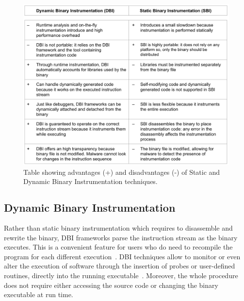 \documentclass[LaM,binding=0.6cm]{sapthesis}
\begin{document}
\begin{figure}[t]
\centering
\includegraphics[scale=.5]{images/techn6}
\caption{Table showing advantages (+) and disadvantages (-) of Static and Dynamic Binary Instrumentation techniques.}
\end{figure}
\subsection{Dynamic Binary Instrumentation}
\label{subsec:dbi}
Rather than static binary instrumentation which requires to disassemble and rewrite the binary, DBI frameworks parse the instruction stream as the binary executes. This is a convenient feature for users who do need to recompile the program for each different execution~\cite{nethercote2007valgrind}. DBI techniques allow to monitor or even alter the execution of software through the insertion of probes or user-defined routines, directly into the running executable~\cite{d2019sok}. Moreover, the whole procedure does not require either accessing the source code or changing the binary executable at run time.\\
\end{document}
